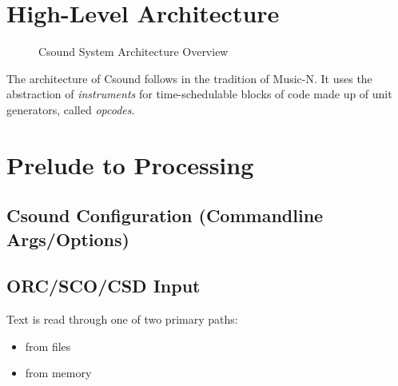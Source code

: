 \documentclass[]{book}
\begin{document}
\chapter{High-Level Architecture}

\begin{figure}[htbp]
\centerline{}
\caption{Csound System Architecture Overview}
\label{overview}
\end{figure}

The architecture of Csound follows in the tradition of Music-N. It uses
the abstraction of \emph{instruments} for time-schedulable blocks of
code made up of unit generators, called \emph{opcodes}. 




\chapter{Prelude to Processing}

\section{Csound Configuration (Commandline Args/Options)}

\section{ORC/SCO/CSD Input}

Text is read through one of two primary paths:

\begin{itemize}
\itemsep1pt\parskip0pt
\item
  from files
\item
  from memory
\end{itemize}
\end{document}
